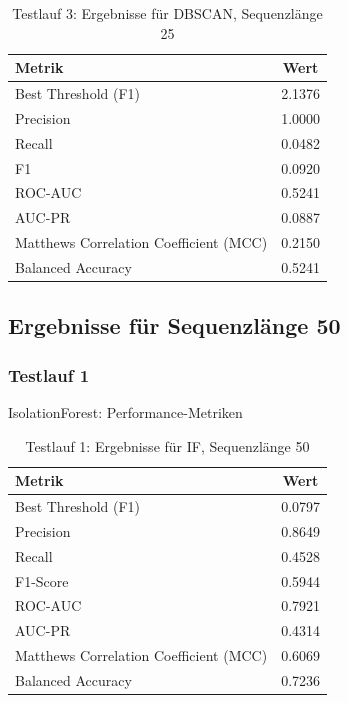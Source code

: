 \documentclass[a4paper,12pt]{article}
\begin{document}
\begin{table}[H]
	\centering
	\begin{tabular}{l c}
		\hline
		Metrik & Wert \\
		\hline
		Best Threshold (F1) & 2.1376 \\
		Precision & 1.0000 \\
		Recall & 0.0482 \\
		F1 & 0.0920 \\
		ROC-AUC & 0.5241 \\
		AUC-PR & 0.0887 \\
		Matthews Correlation Coefficient (MCC) & 0.2150 \\
		Balanced Accuracy & 0.5241 \\
		\hline
	\end{tabular}
	\caption{Testlauf 3: Ergebnisse für DBSCAN, Sequenzlänge 25}
\end{table}

\subsection{Ergebnisse für Sequenzlänge 50}
\subsubsection{Testlauf 1}
\begin{table}[H]
	\centering
	\caption{IsolationForest: Performance-Metriken}
	\begin{tabular}{l c}
		\hline
		Metrik & Wert \\
		\hline
		Best Threshold (F1) & 0.0797 \\
		Precision & 0.8649 \\
		Recall & 0.4528 \\
		F1-Score & 0.5944 \\
		ROC-AUC & 0.7921 \\
		AUC-PR & 0.4314 \\
		Matthews Correlation Coefficient (MCC) & 0.6069 \\
		Balanced Accuracy & 0.7236 \\
		\hline
	\end{tabular}
	\caption{Testlauf 1: Ergebnisse für IF, Sequenzlänge 50}
\end{table}
\end{document}
